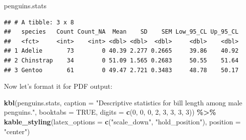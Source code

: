 \documentclass[
]{book}
\newenvironment{Shaded}{\begin{snugshade}}{\end{snugshade}}
\newcommand{\AttributeTok}[1]{\textcolor[rgb]{0.13,0.29,0.53}{#1}}
\newcommand{\ConstantTok}[1]{\textcolor[rgb]{0.56,0.35,0.01}{#1}}
\newcommand{\DecValTok}[1]{\textcolor[rgb]{0.00,0.00,0.81}{#1}}
\newcommand{\FunctionTok}[1]{\textcolor[rgb]{0.13,0.29,0.53}{\textbf{#1}}}
\newcommand{\NormalTok}[1]{#1}
\newcommand{\SpecialCharTok}[1]{\textcolor[rgb]{0.81,0.36,0.00}{\textbf{#1}}}
\newcommand{\StringTok}[1]{\textcolor[rgb]{0.31,0.60,0.02}{#1}}
\begin{document}
\begin{Shaded}
\begin{Highlighting}[]
\NormalTok{penguins.stats}
\end{Highlighting}
\end{Shaded}

\begin{verbatim}
## # A tibble: 3 x 8
##   species   Count Count_NA  Mean    SD    SEM Low_95_CL Up_95_CL
##   <fct>     <int>    <int> <dbl> <dbl>  <dbl>     <dbl>    <dbl>
## 1 Adelie       73        0 40.39 2.277 0.2665     39.86    40.92
## 2 Chinstrap    34        0 51.09 1.565 0.2683     50.55    51.64
## 3 Gentoo       61        0 49.47 2.721 0.3483     48.78    50.17
\end{verbatim}

Now let's format it for PDF output:

\begin{Shaded}
\begin{Highlighting}[]
\FunctionTok{kbl}\NormalTok{(penguins.stats, }\AttributeTok{caption =} \StringTok{"Descriptive statistics for bill length among male penguins."}\NormalTok{, }
    \AttributeTok{booktabs =} \ConstantTok{TRUE}\NormalTok{, }\AttributeTok{digits =} \FunctionTok{c}\NormalTok{(}\DecValTok{0}\NormalTok{, }\DecValTok{0}\NormalTok{, }\DecValTok{0}\NormalTok{, }\DecValTok{2}\NormalTok{, }\DecValTok{3}\NormalTok{, }\DecValTok{3}\NormalTok{, }\DecValTok{3}\NormalTok{, }\DecValTok{3}\NormalTok{)) }\SpecialCharTok{\%\textgreater{}\%} 
  \FunctionTok{kable\_styling}\NormalTok{(}\AttributeTok{latex\_options =} \FunctionTok{c}\NormalTok{(}\StringTok{"scale\_down"}\NormalTok{, }\StringTok{"hold\_position"}\NormalTok{), }\AttributeTok{position =} \StringTok{"center"}\NormalTok{)}
\end{Highlighting}
\end{Shaded}

\begin{table}[!h]
\centering
\caption{\label{tab:givenicepdftable}Descriptive statistics for bill length among male penguins.}
\centering
{}
\end{table}
\end{document}
